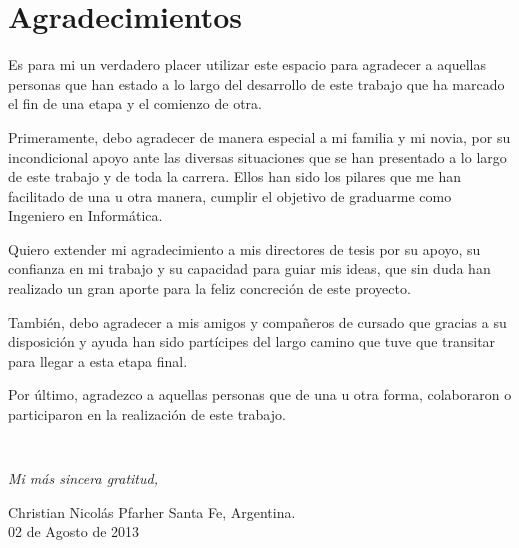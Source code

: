 \chapter*{Agradecimientos}

Es para mi un verdadero placer utilizar este espacio para agradecer a aquellas personas que han estado a lo largo del desarrollo de este trabajo que ha marcado el fin de una etapa y el comienzo de otra.

Primeramente, debo agradecer de manera especial a mi familia y mi novia, por su incondicional apoyo ante las diversas situaciones que se han presentado a lo largo de este trabajo y de toda la carrera. Ellos han sido los pilares que me han facilitado de una u otra manera, cumplir el objetivo de graduarme como Ingeniero en Informática.

Quiero extender mi agradecimiento a mis directores de tesis por su apoyo, su confianza en mi trabajo y su capacidad para guiar mis ideas, que sin duda han realizado un gran aporte para la feliz concreción de este proyecto.

También, debo agradecer a mis amigos y compañeros de cursado que gracias a su disposición y ayuda han sido partícipes del largo camino que tuve que transitar para llegar a esta etapa final.

Por último, agradezco a aquellas personas que de una u otra forma, colaboraron o participaron en la realización de este trabajo.

\verb, ,




\vspace{1cm}
\emph{Mi más sincera gratitud,}

\begin{flushright}
Christian Nicolás Pfarher
Santa Fe, Argentina. \\ 02 de Agosto de 2013
\end{flushright}

